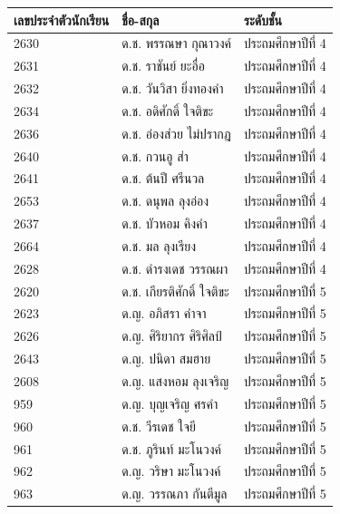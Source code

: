 \begin{center}
    \begin{tabular}{ |p{3cm}|p{4cm}|p{3cm}| }
        \hline
        เลขประจำตัวนักเรียน & ชื่อ-สกุล & ระดับชั้น\\
        \hline
        2630 & ด.ช. พรรณษา กุณาวงค์ & ประถมศึกษาปีที่ 4\\
        \hline
        2631 & ด.ช. ราชันย์ ยะอื่อ & ประถมศึกษาปีที่ 4\\
        \hline
        2632 & ด.ช. วันวิสา ยิ่งทองคำ & ประถมศึกษาปีที่ 4\\
        \hline
        2634 & ด.ช. อดิศักดิ์ ใจติขะ & ประถมศึกษาปีที่ 4\\
        \hline
        2636 & ด.ช. อ่องส่วย ไม่ปรากฎ & ประถมศึกษาปีที่ 4\\
        \hline
        2640 & ด.ช. กวนอู ส่า & ประถมศึกษาปีที่ 4\\
        \hline
        2641 & ด.ช. ต้นปี ศรีนวล & ประถมศึกษาปีที่ 4\\
        \hline
        2653 & ด.ช. ดนุพล ลุงอ่อง & ประถมศึกษาปีที่ 4\\
        \hline
        2637 & ด.ช. บัวหอม คิงคำ & ประถมศึกษาปีที่ 4\\
        \hline
        2664 & ด.ช. มล ลุงเรียง & ประถมศึกษาปีที่ 4\\
        \hline
        2628 & ด.ช. ดำรงเดช วรรณผา & ประถมศึกษาปีที่ 4\\
        \hline
        2620 & ด.ช. เกียรติศักดิ์ ใจติขะ & ประถมศึกษาปีที่ 5\\
        \hline
        2623 & ด.ญ. อภิสรา คำจา & ประถมศึกษาปีที่ 5\\
        \hline
        2626 & ด.ญ. ศิริยากร ศิริศิลป์ & ประถมศึกษาปีที่ 5\\
        \hline
        2643 & ด.ญ. ปนิดา สมฮาย & ประถมศึกษาปีที่ 5\\
        \hline
        2608 & ด.ญ. แสงหอม ลุงเจริญ & ประถมศึกษาปีที่ 5\\
        \hline
        959 & ด.ญ. บุญเจริญ ศรคำ & ประถมศึกษาปีที่ 5\\
        \hline
        960 & ด.ช. วีรเดช ใจยี & ประถมศึกษาปีที่ 5\\
        \hline
        961 & ด.ช. ภูรินท์ มะโนวงค์ & ประถมศึกษาปีที่ 5\\
        \hline
        962 & ด.ญ. วริษา มะโนวงค์ & ประถมศึกษาปีที่ 5\\
        \hline
        963 & ด.ญ. วรรณภา กันตีมูล & ประถมศึกษาปีที่ 5\\
        \hline

\end{tabular}
\end{center}
